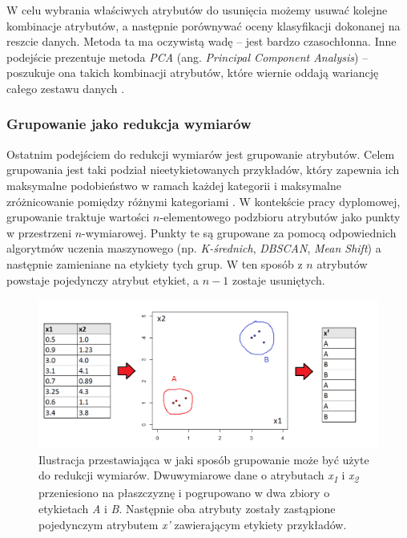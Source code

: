 \documentclass[../thesis.tex]{subfiles}
\begin{document}
W celu wybrania właściwych atrybutów do usunięcia możemy usuwać kolejne kombinacje atrybutów, a następnie porównywać oceny klasyfikacji dokonanej na reszcie danych. Metoda ta ma oczywistą wadę – jest bardzo czasochłonna. Inne podejście prezentuje metoda \emph{PCA} (ang. \emph{Principal Component Analysis}) – poszukuje ona takich kombinacji atrybutów, które wiernie oddają wariancję całego zestawu danych \cite{def_pca}. 

\subsubsection{Grupowanie jako redukcja wymiarów}

Ostatnim podejściem do redukcji wymiarów jest grupowanie atrybutów. Celem grupowania jest taki podział nieetykietowanych przykładów, który zapewnia ich maksymalne podobieństwo w ramach każdej kategorii i maksymalne zróżnicowanie pomiędzy różnymi kategoriami \cite{pcichosz}. W kontekście pracy dyplomowej, grupowanie traktuje wartości $n$-elementowego podzbioru atrybutów jako punkty w przestrzeni $n$-wymiarowej. Punkty te są grupowane za pomocą odpowiednich algorytmów uczenia maszynowego (np. \emph{K-średnich}, \emph{DBSCAN}, \emph{Mean Shift}) a następnie zamieniane na etykiety tych grup. W ten sposób z $n$ atrybutów powstaje pojedynczy atrybut etykiet, a $n-1$ zostaje usuniętych.

\begin{figure}[h]
\centering
\includegraphics[height=.25\textheight]{grouping.png}
\caption{Ilustracja przestawiająca w jaki sposób grupowanie może być użyte do redukcji wymiarów. Dwuwymiarowe dane o atrybutach \emph{x\textsubscript{1}} i \emph{x\textsubscript{2}} przeniesiono na płaszczyznę i pogrupowano w dwa zbiory o etykietach \emph{A} i \emph{B}. Następnie oba atrybuty zostały zastąpione pojedynczym atrybutem \emph{x'} zawierającym etykiety przykładów. }
\label{classification:grouping}
\end{figure}
\end{document}

